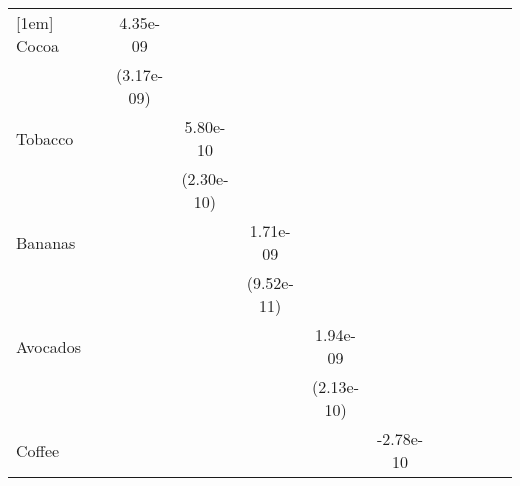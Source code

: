 \begin{table}[htbp]
\begin{tabular}{l*{11}{c}}
[1em]
Cocoa       &                     &    4.35e-09         &                     &                     &                     &                     &                     &                     &                     &                     &                     \\
            &                     &  (3.17e-09)         &                     &                     &                     &                     &                     &                     &                     &                     &                     \\
[1em]
Tobacco     &                     &                     &    5.80e-10\sym{**} &                     &                     &                     &                     &                     &                     &                     &                     \\
            &                     &                     &  (2.30e-10)         &                     &                     &                     &                     &                     &                     &                     &                     \\
[1em]
Bananas     &                     &                     &                     &    1.71e-09\sym{***}&                     &                     &                     &                     &                     &                     &                     \\
            &                     &                     &                     &  (9.52e-11)         &                     &                     &                     &                     &                     &                     &                     \\
[1em]
Avocados    &                     &                     &                     &                     &    1.94e-09\sym{***}&                     &                     &                     &                     &                     &                     \\
            &                     &                     &                     &                     &  (2.13e-10)         &                     &                     &                     &                     &                     &                     \\
[1em]
Coffee      &                     &                     &                     &                     &                     &   -2.78e-10         &                     &                     &                     &                     &                     \\

\end{tabular}
\end{table}
